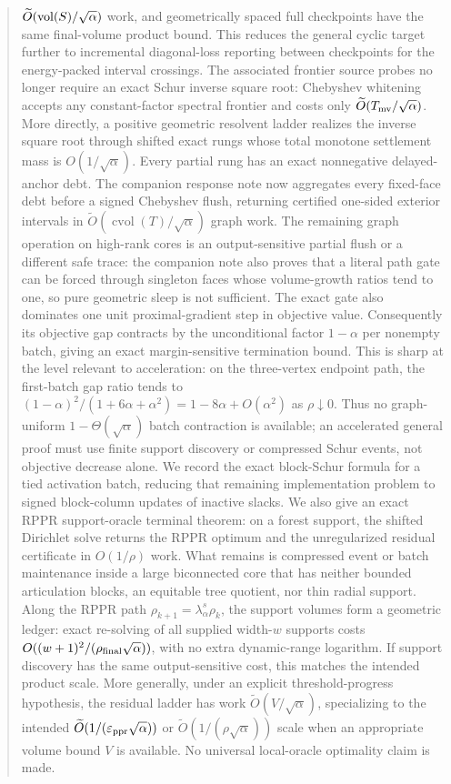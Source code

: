 \documentclass[11pt]{article}
\begin{document}
\begin{abstract}
$\widetilde O(\vol(S)/\sqrt\alpha)$ work, and geometrically spaced full
checkpoints have the same final-volume product bound.  This reduces the
general cyclic target further to incremental diagonal-loss reporting between
checkpoints for the energy-packed interval crossings.  The associated
frontier source probes no longer require an exact Schur inverse square root:
Chebyshev whitening accepts any constant-factor spectral frontier and costs
only $\widetilde O(T_{\rm mv}/\sqrt\alpha)$.  More directly, a positive
geometric resolvent ladder realizes the inverse square root through shifted
exact rungs whose total monotone settlement mass is $O(1/\sqrt\alpha)$.
Every partial rung has an exact nonnegative delayed-anchor debt.  The companion
response note now aggregates every fixed-face debt before a signed Chebyshev
flush, returning certified one-sided exterior intervals in
$\widetilde O(\operatorname{cvol}(T)/\sqrt\alpha)$ graph work.  The remaining
graph operation on high-rank cores is an output-sensitive partial flush or a
different safe trace: the companion note also proves that a literal path gate
can be forced through singleton faces whose volume-growth ratios tend to one,
so pure geometric sleep is not sufficient.
The exact gate also dominates one unit proximal-gradient step in objective
value.  Consequently its objective gap contracts by the unconditional factor
$1-\alpha$ per nonempty batch, giving an exact margin-sensitive termination
bound.  This is sharp at the level relevant to acceleration: on the
three-vertex endpoint path, the first-batch gap ratio tends to
$(1-\alpha)^2/(1+6\alpha+\alpha^2)=1-8\alpha+O(\alpha^2)$ as
$\rho\downarrow0$.  Thus no graph-uniform
$1-\Theta(\sqrt\alpha)$ batch contraction is available; an accelerated
general proof must use finite support discovery or compressed Schur events,
not objective decrease alone.  We record the exact block-Schur formula for a
tied activation batch, reducing that remaining implementation problem to
signed block-column updates of inactive slacks.
We also give an exact RPPR support-oracle terminal theorem: on a forest
support, the shifted Dirichlet solve returns the RPPR optimum and the
unregularized residual certificate in $O(1/\rho)$ work.  What remains is
compressed event or batch maintenance inside a large biconnected core that
has neither bounded articulation blocks, an equitable tree quotient, nor
thin radial support.  Along the RPPR path
$\rho_{k+1}=\lambda_\alpha^s\rho_k$, the support volumes form a geometric
ledger: exact re-solving of all supplied width-$w$ supports costs
$O((w+1)^2/(\rho_{\rm final}\sqrt\alpha))$, with no extra dynamic-range
logarithm.  If support discovery has the same output-sensitive cost, this
matches the intended product scale.  More generally, under an explicit
threshold-progress hypothesis, the residual ladder has work
$\widetilde O(V/\sqrt\alpha)$, specializing to the intended
$\widetilde O(1/(\epsppr\sqrt\alpha))$ or
$\widetilde O(1/(\rho\sqrt\alpha))$ scale when an appropriate volume bound
$V$ is available.  No universal local-oracle optimality claim is made.
\end{abstract}
\end{document}
